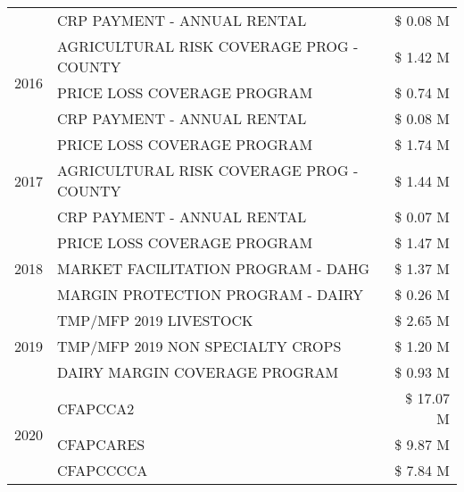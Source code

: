 \begin{tabular}{llr}
 & CRP PAYMENT - ANNUAL RENTAL & \$ 0.08 M \\
\cline{1-3}
\multirow[t]{3}{*}{2016} & AGRICULTURAL RISK COVERAGE PROG - COUNTY      & \$ 1.42 M \\
 & PRICE LOSS COVERAGE PROGRAM                   & \$ 0.74 M \\
 & CRP PAYMENT - ANNUAL RENTAL                   & \$ 0.08 M \\
\cline{1-3}
\multirow[t]{3}{*}{2017} & PRICE LOSS COVERAGE PROGRAM & \$ 1.74 M \\
 & AGRICULTURAL RISK COVERAGE PROG - COUNTY & \$ 1.44 M \\
 & CRP PAYMENT - ANNUAL RENTAL & \$ 0.07 M \\
\cline{1-3}
\multirow[t]{3}{*}{2018} & PRICE LOSS COVERAGE PROGRAM & \$ 1.47 M \\
 & MARKET FACILITATION PROGRAM - DAHG & \$ 1.37 M \\
 & MARGIN PROTECTION PROGRAM - DAIRY & \$ 0.26 M \\
\cline{1-3}
\multirow[t]{3}{*}{2019} & TMP/MFP 2019 LIVESTOCK & \$ 2.65 M \\
 & TMP/MFP 2019 NON SPECIALTY CROPS & \$ 1.20 M \\
 & DAIRY MARGIN COVERAGE PROGRAM & \$ 0.93 M \\
\cline{1-3}
\multirow[t]{3}{*}{2020} & CFAPCCA2 & \$ 17.07 M \\
 & CFAPCARES & \$ 9.87 M \\
 & CFAPCCCCA & \$ 7.84 M \\
\cline{1-3}
\bottomrule
\end{tabular}
